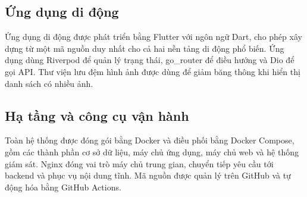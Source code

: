 \documentclass[12pt,a4paper,oneside]{report}
\begin{document}
\subsection{Ứng dụng di động}

Ứng dụng di động được phát triển bằng Flutter với ngôn ngữ Dart, cho phép xây dựng từ một mã nguồn duy nhất cho cả hai nền tảng di động phổ biến. Ứng dụng dùng Riverpod để quản lý trạng thái, go\_router để điều hướng và Dio để gọi API. Thư viện lưu đệm hình ảnh được dùng để giảm băng thông khi hiển thị danh sách có nhiều ảnh.

\subsection{Hạ tầng và công cụ vận hành}

Toàn hệ thống được đóng gói bằng Docker và điều phối bằng Docker Compose, gồm các thành phần cơ sở dữ liệu, máy chủ ứng dụng, máy chủ web và hệ thống giám sát. Nginx đóng vai trò máy chủ trung gian, chuyển tiếp yêu cầu tới backend và phục vụ nội dung tĩnh. Mã nguồn được quản lý trên GitHub và tự động hóa bằng GitHub Actions.
\end{document}
